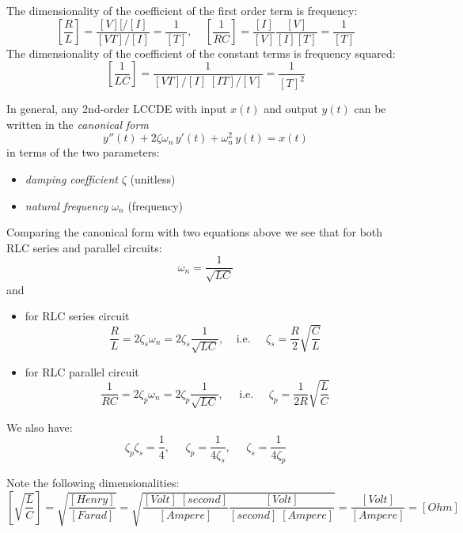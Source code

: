 \documentclass{article}
\begin{document}
The dimensionality of the coefficient of the first order term is
frequency:
\begin{equation}
  \left[\frac{R}{L}\right]=\frac{[V][/[I]}{[VT]/[I]}=\frac{1}{[T]},
    \;\;\;\;
    \left[\frac{1}{RC}\right]=\frac{[I]}{[V]}\frac{[V]}{[I][T]}=\frac{1}{[T]}
\end{equation}
The dimensionality of the coefficient of the constant terms is
frequency squared:
\begin{equation}
  \left[\frac{1}{LC}\right]=\frac{1}{[VT]/[I]\;[IT]/[V]}=\frac{1}{[T]^2}
\end{equation}

In general, any 2nd-order LCCDE with input $x(t)$ and output $y(t)$
can be written in the {\em canonical form}
\begin{equation} 
  y''(t)+2\zeta\omega_n\,y'(t)+\omega_n^2\, y(t)= x(t) 
\end{equation}
in terms of the two parameters:
\begin{itemize}
\item {\em damping coefficient} $\zeta$ (unitless)
\item {\em natural frequency} $\omega_n$ (frequency)
\end{itemize}
Comparing the canonical form with two equations above we see that
for both RLC series and parallel circuits:
\begin{equation}
  \omega_n=\frac{1}{\sqrt{LC}}
\end{equation}
and
\begin{itemize}
\item for RLC series circuit
  \begin{equation}
    \frac{R}{L}=2\zeta_s\omega_n=2\zeta_s\frac{1}{\sqrt{LC}},\;\;\;\;\mbox{i.e.}\;\;\;\;\;
    \zeta_s=\frac{R}{2}\sqrt{\frac{C}{L}}
  \end{equation}
\item for RLC parallel circuit
  \begin{equation}
    \frac{1}{RC}=2\zeta_p\omega_n=2\zeta_p\frac{1}{\sqrt{LC}},
    \;\;\;\;\;\mbox{i.e.}\;\;\;\;\;
    \zeta_p=\frac{1}{2R}\sqrt{\frac{L}{C}}
  \end{equation}  
\end{itemize}
We also have:
\begin{equation}
  \zeta_p \zeta_s=\frac{1}{4},\;\;\;\;\;\zeta_p=\frac{1}{4\zeta_s},
  \;\;\;\;\;\zeta_s=\frac{1}{4\zeta_p}
\end{equation}

Note the following dimensionalities:
\begin{equation} 
  \left[\sqrt{\frac{L}{C}}\right]=\sqrt{\frac{[Henry]}{[Farad]}}
  =\sqrt{\frac{[Volt]\;[second]}{[Ampere]}\frac{[Volt]}{[second]\;[Ampere]}}
  =\frac{[Volt]}{[Ampere]}=[Ohm] 
\end{equation}
\end{document}
